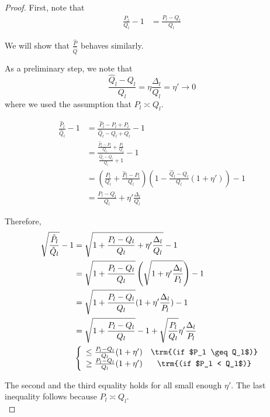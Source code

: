 \documentclass{article}
\begin{document}
\begin{proof}


First, note that 
\begin{align*}
 \frac{P_l}{Q_l} - 1 &= \frac{P_l - Q_l}{Q_l}  
\end{align*}

We will show that $\frac{\hat{P}}{\hat{Q}}$ behaves similarly. 

As a preliminary step, we note that
\[
\frac{\hat{Q}_l - Q_l}{Q_l} = \eta \frac{\Delta_l}{Q_l} = \eta' \rightarrow 0
\]
where we used the assumption that $P_l \asymp Q_l$.

\begin{align*}
\frac{\hat{P}_l}{\hat{Q}_l} - 1 &= 
     \frac{ \hat{P}_l - P_l + P_l }{ \hat{Q}_l - Q_l + Q_l} -1  \\
  &=  \frac{  \frac{\hat{P}_l - P_l}{Q_l} + \frac{P_l}{Q_l}}
       { \frac{\hat{Q}_l - Q_l}{Q_l} + 1} - 1 \\
 &= \left( \frac{P_l}{Q_l} + \frac{\hat{P}_l - P_l}{Q_l} \right)
    \left( 1 - \frac{\hat{Q}_l - Q_l}{Q_l} (1 + \eta')  \right) -1  \\
 &= \frac{P_l-Q_l}{Q_l} + \eta' \frac{\Delta_l}{Q_l} 
\end{align*}



Therefore, 
\begin{align*}
\sqrt{ \frac{\hat{P}_l}{\hat{Q}_l}} - 1 &= 
   \sqrt{ 1 + \frac{P_l - Q_l}{Q_l} + \eta' \frac{\Delta_l}{Q_l}}  - 1\\
  &= \sqrt{ 1 + \frac{P_l - Q_l}{Q_l} } 
    \left( \sqrt{ 1 + \eta' \frac{\Delta_l}{P_l}} \right) - 1 \\
  &= \sqrt{ 1 + \frac{P_l - Q_l}{Q_l} } (1 + \eta' \frac{\Delta_l}{P_l} ) - 1  \\
  &= \sqrt{ 1 + \frac{P_l - Q_l}{Q_l}} - 1 + \sqrt{ \frac{P_l}{Q_l}} \eta' \frac{\Delta_l}{P_l} \\ 
  & \left\{ \begin{array}{cc}
      \leq \frac{P_l - Q_l}{Q_l} (1+ \eta') & \trm{(if $P_l \geq Q_l$)} \\
      \geq \frac{P_l - Q_l}{Q_l} (1+ \eta') & \trm{(if $P_l < Q_l$)} 
     \end{array} \right.
\\
\end{align*}

The second and the third equality holds for all small enough $\eta'$. The last inequality follows because $P_l \asymp Q_l$. \\



\end{proof}
\end{document}
